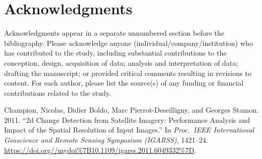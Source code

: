 \documentclass{josis}
\newlength{\cslhangindent}
\newenvironment{CSLReferences}[2] %
 {%
  \setlength{\parindent}{0pt}
  \ifodd #1 \everypar{\setlength{\hangindent}{\cslhangindent}}\ignorespaces\fi
  \ifnum #2 > 0
  \setlength{\parskip}{#2\baselineskip}
  \fi
 }%
 {}
\begin{document}
\section*{Acknowledgments}

Acknowledgments appear in a separate unnumbered section before the
bibliography. Please acknowledge anyone (individual/company/institution)
who has contributed to the study, including substantial contributions to
the conception, design, acquisition of data; analysis and interpretation
of data; drafting the manuscript; or provided critical comments
resulting in revisions to content. For each author, please list the
source(s) of any funding or financial contributions related to the
study.

\hypertarget{refs}{}
\begin{CSLReferences}{1}{0}
\leavevmode{}%
Champion, Nicolas, Didier Boldo, Marc Pierrot-Deseilligny, and Georges
Stamon. 2011. {``{2d} Change Detection from Satellite Imagery:
Performance Analysis and Impact of the Spatial Resolution of Input
Images.''} In \emph{Proc.~IEEE International Geoscience and Remote
Sensing Symposium (IGARSS)}, 1421--24.
\url{https://doi.org//mydoi\%7B10.1109/igarss.2011.6049332\%7D}.

\end{CSLReferences}



\end{document}
